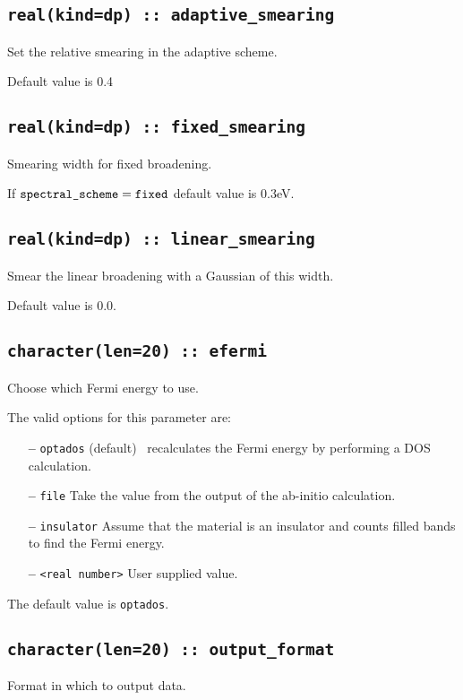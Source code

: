\documentclass[a4paper,11pt,twoside]{book}
\begin{document}
{\subsection[adaptive\_smearing]{\tt real(kind=dp) :: adaptive\_smearing}
Set the relative smearing in the adaptive scheme.

Default value is 0.4

\subsection[fixed\_smearing]{\tt real(kind=dp) :: fixed\_smearing}
Smearing width for fixed broadening.

If $\verb#spectral_scheme# = \verb#fixed#$ default value is 0.3eV.


\subsection[adaptive\_smearing]{\tt real(kind=dp) :: linear\_smearing}
Smear the linear broadening with a Gaussian of this width.

Default value is 0.0.

\subsection[compute\_efermi]{{\tt character(len=20) :: efermi}}
Choose which Fermi energy to use.

The valid options for this parameter are:
\begin{itemize}
\item[{\bf --}]  \verb#optados# (default) \optados\ recalculates the Fermi energy by performing a DOS calculation.
\item[{\bf --}]  \verb#file# Take the value from the output of the ab-initio calculation.
\item[{\bf --}]  \verb#insulator# Assume that the material is an insulator and counts filled bands to find the Fermi energy.
\item[{\bf --}]  \verb#<real number># User supplied value.
\end{itemize}

The default value is {\tt optados}.


\subsection[output\_format]{\tt character(len=20) :: output\_format}
Format in which to output data.

}
\end{document}
